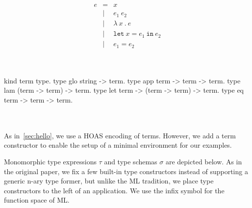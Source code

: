 \documentclass[a4paper, 11pt]{book}
\begin{document}
\begin{center}
\begin{minipage}{0.35\textwidth}
$$
\begin{array}{lrl}
  e & =     & x                                 \\
  & \vert & e_1\ e_2                            \\
  & \vert & \lambda\ x\ .\ e                    \\
  & \vert & \mathtt{let}\ x = e_1\ \mathtt{in}\ e_2 \\
  & \vert & e_1 = e_2 \\
\end{array}
$$
\end{minipage}~~
\begin{minipage}{0.60\textwidth}
\vspace{0.5em}
\begin{elpicodelj}
kind term   type.
type glo string -> term.
type app    term -> term -> term.
type lam    (term -> term) -> term.
type let    term -> (term -> term) -> term.
type eq     term -> term -> term.
\end{elpicodelj}
\end{minipage}
\end{center}
~\\  
~\\  

As in~\cref{sec:hello}, we use a HOAS encoding of terms. However, we add a
 term constructor to enable the setup of a minimal environment
for our examples.

Monomorphic type expressions $\tau$ and type schemas $\sigma$ are depicted
below. As in the original paper, we fix a few built-in type constructors
instead of supporting a generic n-ary type former, but unlike the ML
tradition, we place type constructors to the left of an application. We use
the infix symbol \elpi{-->} for the function space of ML.
\end{document}
